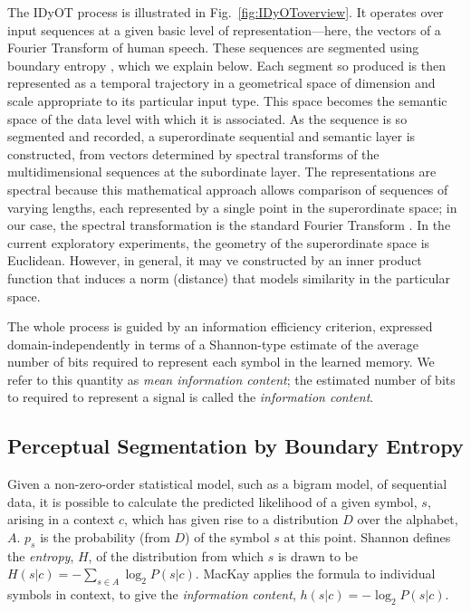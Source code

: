 \documentclass[runningheads]{llncs}
\begin{document}
The IDyOT process is illustrated in Fig.~\ref{fig:IDyOToverview}. It operates over 
input sequences at a given basic level of representation---here, the vectors of a Fourier Transform of human speech. These sequences are segmented using boundary entropy \cite{SproatShihEtAl94}, which we explain below. Each segment so produced is then represented as a temporal trajectory in a geometrical space of dimension and scale appropriate to its particular input type.  This space becomes the semantic space of the data level with which it is associated. As the sequence is so segmented and recorded, a superordinate sequential and semantic layer is constructed, from vectors determined by spectral transforms of the multidimensional sequences at the subordinate layer. The representations are spectral because this mathematical approach allows comparison of sequences of varying lengths, each represented by a single point in the superordinate space; in our case, the spectral transformation is the standard Fourier Transform \cite{KennedySadeghi13}. In the current exploratory experiments, the geometry of the superordinate space is Euclidean. However, in general, it may ve constructed by an inner product function that induces a norm (distance) that models similarity in the particular space.

The whole process is guided by an information efficiency criterion, expressed domain-independently in terms of a Shannon-type estimate of the average number of bits required to represent each symbol in the learned memory. We refer to this quantity as {\it mean information content}; the estimated number of bits to required to represent a signal is called the {\it information content}.

\subsection{Perceptual Segmentation by Boundary Entropy}

Given a non-zero-order statistical model, such as a bigram model, of sequential data, it is possible to calculate the predicted likelihood of a given symbol, $s$, arising in a context $c$, which has given rise to a distribution $D$ over the alphabet, $A$. $p_s$ is the probability (from $D$) of the symbol $s$ at this point. Shannon \citep{Shannon48} defines the {\it entropy}, $H$, of the distribution from which $s$ is drawn to be 
$H(s|c)=-\sum_{s\in A}\log_2P(s|c)$.
MacKay \citep{MacKay03} applies the formula to individual symbols in context, to give the {\it information content},
$h(s|c)=-\log_2P(s|c)$.
\end{document}
